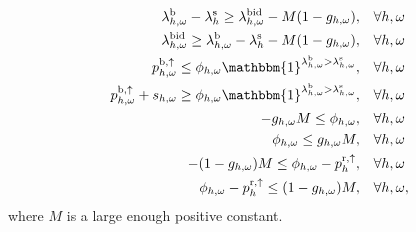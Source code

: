 \begin{subequations}\label{eq:bid_constraint_relaxed}
    \begin{align}
        \lambda_{h,\omega}^{\rm{b}} - \lambda_{h}^{\rm{s}} \geq \lambda_{h,\omega}^{\rm{bid}} - M  (1 - g_{h,\omega}) , \quad                               & \forall{h,\omega}             \label{con_bid:subeq1}  \\
        \lambda_{h,\omega}^{\rm{bid}} \geq \lambda_{h,\omega}^{\rm{b}} - \lambda_{h}^{\rm{s}} - M  (1 - g_{h,\omega}) , \quad                               & \forall{h,\omega}             \label{con_bid:subeq2}  \\
        p^{\rm{b}, \uparrow}_{h,\omega} \leq \phi_{h,\omega}  \mathbbm{1}^{\lambda^{\rm{b}}_{h,\omega} > \lambda^{\rm{s}}_{h,\omega}}, \quad                & \forall{{h,\omega}}           \label{con_bid:subeq3}  \\
        p^{\rm{b}, \uparrow}_{h,\omega} + s_{h,\omega} \geq \phi_{h,\omega}  \mathbbm{1}^{\lambda^{\rm{b}}_{h,\omega} > \lambda^{\rm{s}}_{h,\omega}}, \quad & \forall{{h,\omega}}           \label{con_bid:subeq4}  \\
        -g_{h,\omega}  M \leq \phi_{h,\omega}, \quad                                                                                                        & \forall{h,\omega}             \label{con_bid:subeq5}  \\
        \phi_{h,\omega} \leq g_{h,\omega}  M, \quad                                                                                                         & \forall{h,\omega}             \label{con_bid:subeq6}  \\
        -(1 - g_{h,\omega})  M \leq \phi_{h,\omega} - p^{\rm{r},\uparrow}_{h}, \quad                                                                        & \forall{h,\omega}             \label{con_bid:subeq7}  \\
        \phi_{h,\omega} - p^{\rm{r},\uparrow}_{h} \leq (1 - g_{h,\omega})  M, \quad                                                                         & \forall{h,\omega},             \label{con_bid:subeq8}
    \end{align}
\end{subequations}
where $M$ is a large enough positive constant.
